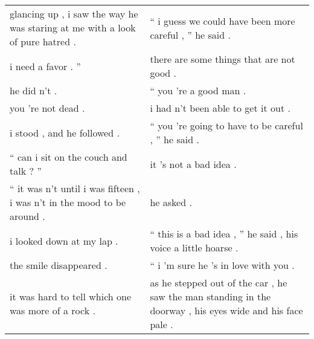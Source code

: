 \documentclass{article}
\begin{document}
\begin{table}[!h]
\begin{center}
{\begin{small}
\begin{tabular}{ll}
                glancing up , i saw the way he was staring at me with a look of pure hatred .                      &                                        `` i guess we could have been more careful , '' he said .                           \\
                                                             i need a favor . ''                                   &                                                   there are some things that are not good .                                \\
                                                                  he did n't .                                     &                                                                   `` you 're a good man .                                  \\
                                                             you 're not dead .                                    &                                                          i had n't been able to get it out .                               \\
                                                      i stood , and he followed .                                  &                                            `` you 're going to have to be careful , '' he said .                           \\
                                              `` can i sit on the couch and talk ? ''                              &                                                                    it 's not a bad idea .                                  \\
                     `` it was n't until i was fifteen , i was n't in the mood to be around .                      &                                                                            he asked .                                      \\
                                                        i looked down at my lap .                                  &                                    `` this is a bad idea , '' he said , his voice a little hoarse .                        \\
                                                       the smile disappeared .                                     &                                                         `` i 'm sure he 's in love with you .                              \\
                                     it was hard to tell which one was more of a rock .                            &   as he stepped out of the car , he saw the man standing in the doorway , his eyes wide and his face pale .                \\

\end{tabular}
\end{small}}
\end{center}
\end{table}
\end{document}
